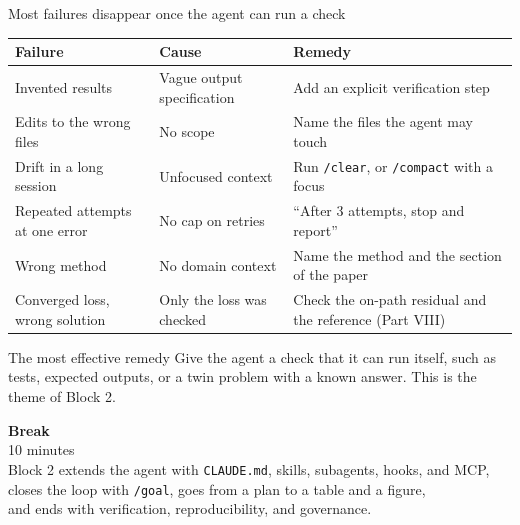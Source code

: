 \documentclass[aspectratio=169,10pt]{beamer}
\newcommand{\emphc}[1]{\textcolor{harvardcrimson}{#1}}
\begin{document}
\begin{frame}{Most failures disappear once the agent can run a check}
\begin{center}
\small
\renewcommand{\arraystretch}{1.3}
\begin{tabular}{@{}>{\raggedright\arraybackslash}p{4.0cm} >{\raggedright\arraybackslash}p{3.6cm} >{\raggedright\arraybackslash}p{5.4cm}@{}}
\toprule
\textbf{Failure} & \textbf{Cause} & \textbf{Remedy} \\
\midrule
Invented results & Vague output specification & Add an explicit verification step \\
Edits to the wrong files & No scope & Name the files the agent may touch \\
Drift in a long session & Unfocused context & Run \texttt{/clear}, or \texttt{/compact} with a focus \\
Repeated attempts at one error & No cap on retries & ``After 3 attempts, stop and report'' \\
Wrong method & No domain context & Name the method and the section of the paper \\
Converged loss, wrong solution & Only the loss was checked & Check the on-path residual and the reference (Part VIII) \\
\bottomrule
\end{tabular}
\end{center}

\vspace{0.6em}
\begin{block}{The most effective remedy}
\emphc{Give the agent a check that it can run itself}, such as tests, expected outputs, or a twin problem with a known answer. This is the theme of Block 2.
\end{block}
\end{frame}

\begin{frame}{}
\vfill
\begin{center}
{\Huge \textcolor{uzhblue}{\textbf{Break}}}\\[12pt]
{\LARGE 10 minutes}\\[16pt]
{\small Block 2 extends the agent with \texttt{CLAUDE.md}, skills, subagents, hooks, and MCP,\\closes the loop with \texttt{/goal}, goes from a plan to a table and a figure,\\and ends with verification, reproducibility, and governance.}
\end{center}
\vfill
\end{frame}
\end{document}
